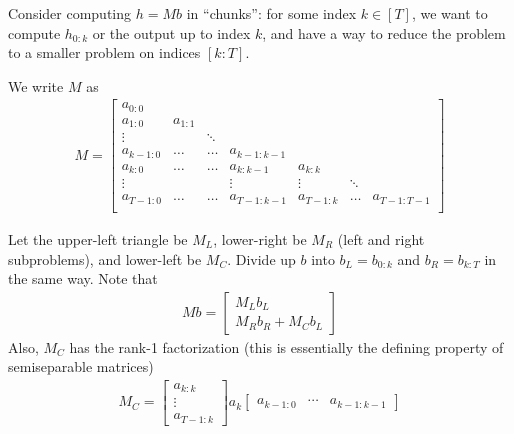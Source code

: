 Consider computing $h = Mb$ in ``chunks'': for some index $k \in [T]$, we want to compute $h_{0:k}$ or the output up to index $k$, and have a way to reduce the problem to a smaller problem on indices $[k:T]$.


We write $M$ as
\begin{align*}%
  M =
  \begin{bmatrix}
    a_{0:0} & \\
    a_{1:0} & a_{1:1} \\
    \vdots & & \ddots \\
    a_{k-1:0} & \dots & \dots & a_{k-1:k-1} \\
    a_{k:0} & \dots & \dots & a_{k:k-1} & a_{k:k} \\
    \vdots & & & \vdots & \vdots & \ddots \\
    a_{T-1:0} & \dots & \dots & a_{T-1:k-1} & a_{T-1:k} & \dots & a_{T-1:T-1} \\
  \end{bmatrix}
\end{align*}

Let the upper-left triangle be $M_L$, lower-right be $M_R$ (left and right subproblems), and lower-left be $M_C$.
Divide up $b$ into $b_L = b_{0:k}$ and $b_R = b_{k:T}$ in the same way.
Note that
\begin{align*}%
  Mb = \begin{bmatrix} M_L b_L \\ M_R b_R + M_C b_L \end{bmatrix}
\end{align*}
Also, $M_C$ has the rank-1 factorization (this is essentially the defining property of semiseparable matrices)
\begin{align*}%
  M_C =
  \begin{bmatrix} a_{k:k} \\ \vdots \\ a_{T-1:k} \end{bmatrix}
  a_k
  \begin{bmatrix} a_{k-1:0} & \cdots & a_{k-1:k-1} \end{bmatrix}
\end{align*}

